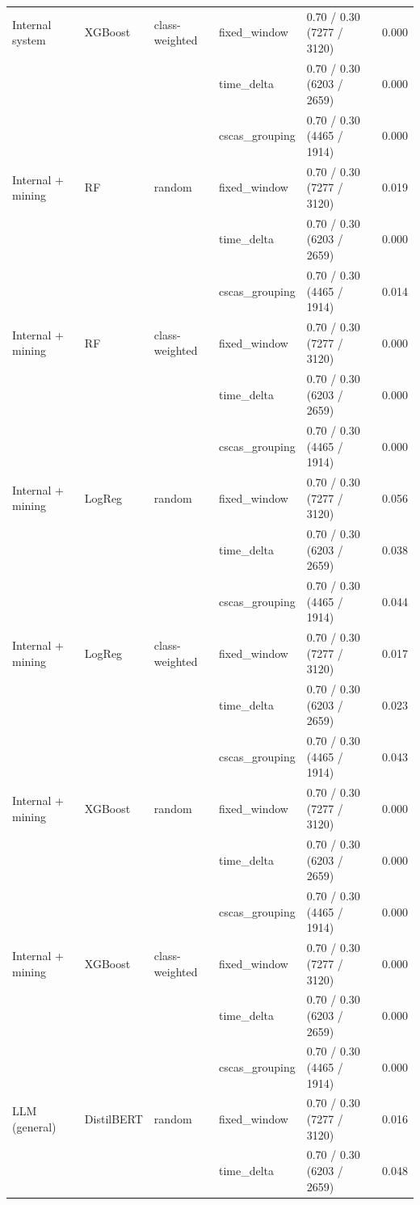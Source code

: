 \begin{table}[htbp]
{\begin{tabular}{lllllc}
Internal system & XGBoost & class-weighted & fixed\_window & 0.70 / 0.30 (7277 / 3120) & 0.000 \\
 &  &  & time\_delta & 0.70 / 0.30 (6203 / 2659) & 0.000 \\
 &  &  & cscas\_grouping & 0.70 / 0.30 (4465 / 1914) & 0.000 \\
\midrule
Internal + mining & RF & random & fixed\_window & 0.70 / 0.30 (7277 / 3120) & 0.019 \\
 &  &  & time\_delta & 0.70 / 0.30 (6203 / 2659) & 0.000 \\
 &  &  & cscas\_grouping & 0.70 / 0.30 (4465 / 1914) & 0.014 \\
\addlinespace
Internal + mining & RF & class-weighted & fixed\_window & 0.70 / 0.30 (7277 / 3120) & 0.000 \\
 &  &  & time\_delta & 0.70 / 0.30 (6203 / 2659) & 0.000 \\
 &  &  & cscas\_grouping & 0.70 / 0.30 (4465 / 1914) & 0.000 \\
\addlinespace
Internal + mining & LogReg & random & fixed\_window & 0.70 / 0.30 (7277 / 3120) & 0.056 \\
 &  &  & time\_delta & 0.70 / 0.30 (6203 / 2659) & 0.038 \\
 &  &  & cscas\_grouping & 0.70 / 0.30 (4465 / 1914) & 0.044 \\
\addlinespace
Internal + mining & LogReg & class-weighted & fixed\_window & 0.70 / 0.30 (7277 / 3120) & 0.017 \\
 &  &  & time\_delta & 0.70 / 0.30 (6203 / 2659) & 0.023 \\
 &  &  & cscas\_grouping & 0.70 / 0.30 (4465 / 1914) & 0.043 \\
\addlinespace
Internal + mining & XGBoost & random & fixed\_window & 0.70 / 0.30 (7277 / 3120) & 0.000 \\
 &  &  & time\_delta & 0.70 / 0.30 (6203 / 2659) & 0.000 \\
 &  &  & cscas\_grouping & 0.70 / 0.30 (4465 / 1914) & 0.000 \\
\addlinespace
Internal + mining & XGBoost & class-weighted & fixed\_window & 0.70 / 0.30 (7277 / 3120) & 0.000 \\
 &  &  & time\_delta & 0.70 / 0.30 (6203 / 2659) & 0.000 \\
 &  &  & cscas\_grouping & 0.70 / 0.30 (4465 / 1914) & 0.000 \\
\midrule
LLM (general) & DistilBERT & random & fixed\_window & 0.70 / 0.30 (7277 / 3120) & 0.016 \\
 &  &  & time\_delta & 0.70 / 0.30 (6203 / 2659) & 0.048 \\

\end{tabular}}
\end{table}
